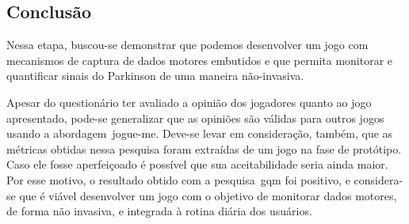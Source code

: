 %

\subsection{Conclusão} 
Nessa etapa, buscou-se demonstrar que podemos desenvolver um jogo com mecanismos de captura de dados motores embutidos e que permita monitorar e quantificar sinais do Parkinson de uma maneira não-invasiva. 

Apesar do questionário ter avaliado a opinião dos jogadores quanto ao jogo apresentado, pode-se generalizar que as opiniões são válidas para outros jogos usando a abordagem~\ac{jogue-me}. Deve-se levar em consideração, também, que as métricas obtidas nessa pesquisa foram extraídas de um jogo na fase de protótipo. Caso ele fosse aperfeiçoado é possível que sua aceitabilidade seria ainda maior. Por esse motivo, o resultado obtido com a pesquisa~\ac{gqm} foi positivo, e considera-se que é viável desenvolver um jogo com o objetivo de monitorar dados motores, de forma não invasiva, e integrada à rotina diária dos usuários.



